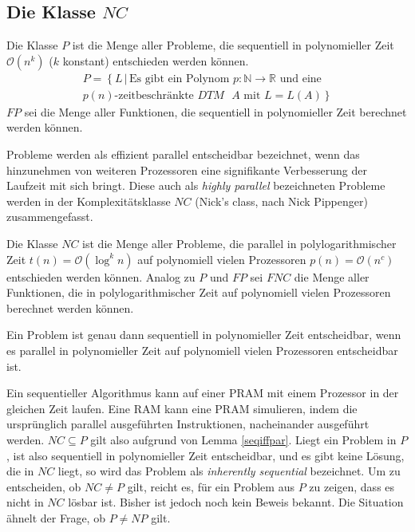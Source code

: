 \subsection{Die Klasse $NC$}
\begin{define}
    Die Klasse $P$ ist die Menge aller Probleme, die sequentiell in 
    polynomieller Zeit $\mathcal{O}(n^k)$ ($k$ konstant) entschieden werden können.
    \begin{equation}
        \begin{split}
            P = \left\{ L \, | \, \text{Es gibt ein Polynom } p\colon \mathbb{N} \to \mathbb{R} \right.
            \text{ und eine} \\ \left. \text{$p(n)$-zeitbeschränkte $DTM$ $A$ mit } L = L(A) \right\}
        \end{split}
    \end{equation}
    $FP$ sei die Menge aller Funktionen, die sequentiell in polynomieller Zeit
    berechnet werden können.
    \cite[S.205]{fgi1}\cite[S.44f]{greenlaw}
\end{define}
%
Probleme werden als effizient parallel entscheidbar bezeichnet, wenn das
hinzunehmen von weiteren Prozessoren eine signifikante Verbesserung der
Laufzeit mit sich bringt.
Diese auch als \emph{highly parallel} bezeichneten Probleme werden in der
Komplexitätsklasse $NC$ (Nick's class, nach Nick Pippenger) zusammengefasst.
%
\begin{define}
    Die Klasse $NC$ ist die Menge aller Probleme, die parallel in
    polylogarithmischer Zeit $t(n) = \mathcal{O}(\log^k n)$ auf polynomiell
    vielen Prozessoren $p(n) = \mathcal{O}(n^c)$ entschieden werden können.
    Analog zu $P$ und $FP$ sei $FNC$ die Menge aller Funktionen, die in
    polylogarithmischer Zeit auf polynomiell vielen Prozessoren berechnet
    werden können.
    \cite[S.44f]{greenlaw}
\end{define}
%
\begin{lemma}
    Ein Problem ist genau dann sequentiell in polynomieller Zeit entscheidbar,
    wenn es parallel in polynomieller Zeit auf polynomiell vielen Prozessoren
    entscheidbar ist.\cite[S.44]{greenlaw}
    \label{seqiffpar}
\end{lemma}
%
Ein sequentieller Algorithmus kann auf einer PRAM mit einem Prozessor in der
gleichen Zeit laufen.
Eine RAM kann eine PRAM simulieren, indem die ursprünglich parallel
ausgeführten Instruktionen, nacheinander ausgeführt werden.
$NC \subseteq P$ gilt also aufgrund von Lemma \ref{seqiffpar}.
%
Liegt ein Problem in $P$, ist also sequentiell in polynomieller Zeit
entscheidbar, und es gibt keine Lösung, die in $NC$ liegt, so wird das
Problem als \emph{inherently sequential} bezeichnet.
Um zu entscheiden, ob $NC \neq P$ gilt, reicht es, für ein Problem aus $P$ zu
zeigen, dass es nicht in $NC$ lösbar ist.
Bisher ist jedoch noch kein Beweis bekannt.
Die Situation ähnelt der Frage, ob $P \neq NP$ gilt.

